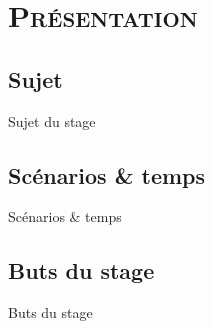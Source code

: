 \section{\scshape Présentation}
\subsection{Sujet}
\begin{frame}{Sujet du stage}
	
\end{frame}

\subsection{Scénarios \& temps}
\begin{frame}{Scénarios \& temps}

\end{frame}

\subsection{Buts du stage}
\begin{frame}{Buts du stage}

\end{frame}

